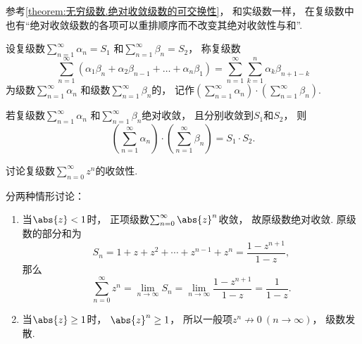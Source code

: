 参考\cref{theorem:无穷级数.绝对收敛级数的可交换性}，
和实级数一样，
在复级数中也有“绝对收敛级数的各项可以重排顺序而不改变其绝对收敛性与和”.

\begin{definition}
设复级数\(\sum_{n=1}^\infty \alpha_n = S_1\)
和\(\sum_{n=1}^\infty \beta_n = S_2\)，
称复级数\begin{equation*}
	\sum_{n=1}^\infty (
		\alpha_1 \beta_n + \alpha_2 \beta_{n-1} + \dotsc + \alpha_n \beta_1
	)
	= \sum_{n=1}^\infty
		\sum_{k=1}^n \alpha_k \beta_{n+1-k}
\end{equation*}为级数\(\sum_{n=1}^\infty \alpha_n\)
和级数\(\sum_{n=1}^\infty \beta_n\)的，
记作\(\left( \sum_{n=1}^\infty \alpha_n \right) \cdot \left( \sum_{n=1}^\infty \beta_n \right)\).
\end{definition}

\begin{theorem}
若复级数\(\sum_{n=1}^\infty \alpha_n\)
和\(\sum_{n=1}^\infty \beta_n\)绝对收敛，
且分别收敛到\(S_1\)和\(S_2\)，
则\begin{equation*}
	\left( \sum_{n=1}^\infty \alpha_n \right)
	\cdot \left( \sum_{n=1}^\infty \beta_n \right)
	= S_1 \cdot S_2.
\end{equation*}
\end{theorem}

\begin{example}[复等比级数]\label{example:解析级数的级数表示.复等比级数}
讨论复级数\(\sum_{n=0}^\infty z^n\)的收敛性.
\begin{solution}
分两种情形讨论：\begin{enumerate}
	\item 当\(\abs{z} < 1\)时，
	正项级数\(\sum_{n=0}^\infty \abs{z}^n\)收敛，
	故原级数绝对收敛.
	原级数的部分和为\begin{equation*}
		S_n
		= 1 + z + z^2 + \dotsb + z^{n-1} + z^n
		= \frac{1-z^{n+1}}{1-z},
	\end{equation*}
	那么\begin{equation*}
		\sum_{n=0}^\infty z^n
		= \lim_{n\to\infty} S_n
		= \lim_{n\to\infty} \frac{1-z^{n+1}}{1-z}
		= \frac{1}{1-z}.
	\end{equation*}

	\item 当\(\abs{z} \geq 1\)时，
	\(\abs{z}^n \geq 1\)，
	所以一般项\(z^n \not\to 0\ (n\to\infty)\)，
	级数发散.
\end{enumerate}
\end{solution}
\end{example}
